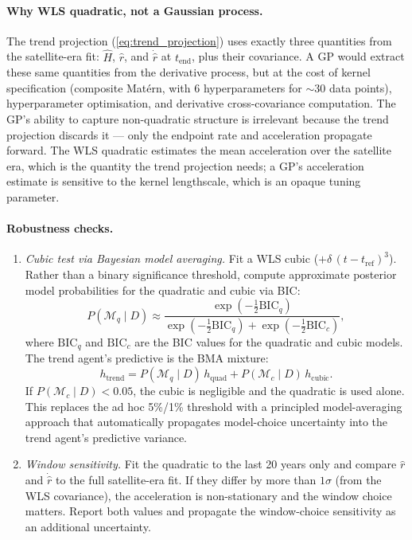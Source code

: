 \documentclass[11pt]{article}
\newcommand{\tend}{t_{\mathrm{end}}}
\begin{document}
\paragraph{Why WLS quadratic, not a Gaussian process.}  The trend projection (\cref{eq:trend_projection}) uses exactly three quantities from the satellite-era fit: $\hat{H}$, $\hat{r}$, and $\dot{\hat{r}}$ at $\tend$, plus their covariance.  A GP would extract these same quantities from the derivative process, but at the cost of kernel specification (composite Mat\'ern, with 6 hyperparameters for $\sim$30 data points), hyperparameter optimisation, and derivative cross-covariance computation.  The GP's ability to capture non-quadratic structure is irrelevant because the trend projection discards it --- only the endpoint rate and acceleration propagate forward.  The WLS quadratic estimates the mean acceleration over the satellite era, which is the quantity the trend projection needs; a GP's acceleration estimate is sensitive to the kernel lengthscale, which is an opaque tuning parameter.

\paragraph{Robustness checks.}
\begin{enumerate}
  \item \textit{Cubic test via Bayesian model averaging.}  Fit a WLS cubic ($+ \delta\,(t - t_{\mathrm{ref}})^3$).  Rather than a binary significance threshold, compute approximate posterior model probabilities for the quadratic and cubic via BIC:
  \begin{equation}
    P(\mathcal{M}_q \mid D) \approx \frac{\exp(-\tfrac{1}{2}\mathrm{BIC}_q)}{\exp(-\tfrac{1}{2}\mathrm{BIC}_q) + \exp(-\tfrac{1}{2}\mathrm{BIC}_c)},
  \end{equation}
  where $\mathrm{BIC}_q$ and $\mathrm{BIC}_c$ are the BIC values for the quadratic and cubic models.  The trend agent's predictive is the BMA mixture:
  \begin{equation}
    h_{\mathrm{trend}} = P(\mathcal{M}_q \mid D)\,h_{\mathrm{quad}} + P(\mathcal{M}_c \mid D)\,h_{\mathrm{cubic}}.
  \end{equation}
  If $P(\mathcal{M}_c \mid D) < 0.05$, the cubic is negligible and the quadratic is used alone.  This replaces the ad hoc 5\%/1\% threshold with a principled model-averaging approach that automatically propagates model-choice uncertainty into the trend agent's predictive variance.
  \item \textit{Window sensitivity.}  Fit the quadratic to the last 20 years only and compare $\hat{r}$ and $\dot{\hat{r}}$ to the full satellite-era fit.  If they differ by more than $1\sigma$ (from the WLS covariance), the acceleration is non-stationary and the window choice matters.  Report both values and propagate the window-choice sensitivity as an additional uncertainty.
\end{enumerate}
\end{document}
